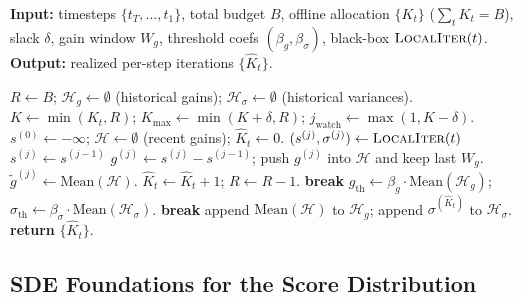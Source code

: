 \begin{algorithm}[t]
\caption{GAINS: Global Adaptive Inference-time Noise Scheduling}
\label{alg:offline_online_budget}
\begin{algorithmic}[1]
\STATE \textbf{Input:} timesteps $\{t_T,\dots,t_1\}$, total budget $B$, offline allocation $\{K_t\}$ ($\sum_t K_t=B$),
slack $\delta$, gain window $W_g$, threshold coefs $(\beta_g,\beta_\sigma)$, black-box $\textsc{LocalIter}(t)$.
\STATE \textbf{Output:} realized per-step iterations $\{\widehat K_t\}$.

\STATE $R \leftarrow B$; \quad $\mathcal{H}_g\leftarrow\emptyset$ (historical gains); \quad $\mathcal{H}_\sigma\leftarrow\emptyset$ (historical variances).
    \STATE $K \leftarrow \min(K_t, R)$; \quad $K_{\max}\leftarrow \min(K+\delta, R)$; \quad $j_{\text{watch}}\leftarrow \max(1, K-\delta)$.
    \STATE $s^{(0)} \leftarrow -\infty$; \quad $\mathcal{H}\leftarrow\emptyset$ (recent gains); \quad $\widehat K_t \leftarrow 0$.
        \STATE $(s^{(j)}, \sigma^{(j)}) \leftarrow \textsc{LocalIter}(t)$
            \STATE $s^{(j)} \leftarrow s^{(j-1)}$ \hfill {}
        \ENDIF
        \STATE $g^{(j)} \leftarrow s^{(j)} - s^{(j-1)}$; push $g^{(j)}$ into $\mathcal{H}$ and keep last $W_g$.
        \STATE $\widetilde g^{(j)} \leftarrow \mathrm{Mean}(\mathcal{H})$.
        \STATE $\widehat K_t \leftarrow \widehat K_t + 1$; \quad $R \leftarrow R - 1$.
         \STATE \textbf{break} \ENDIF
            \STATE $g_{\mathrm{th}}\leftarrow \beta_g \cdot \mathrm{Mean}(\mathcal{H}_g)$;\quad
                   $\sigma_{\mathrm{th}}\leftarrow \beta_\sigma \cdot \mathrm{Mean}(\mathcal{H}_\sigma)$.
                \STATE \textbf{break}
            \ENDIF
        \ENDIF
    \ENDFOR
    \STATE append $\mathrm{Mean}(\mathcal{H})$ to $\mathcal{H}_g$; append $\sigma^{(\widehat K_t)}$ to $\mathcal{H}_\sigma$.
\ENDFOR
\STATE \textbf{return} $\{\widehat K_t\}$.
\end{algorithmic}
\end{algorithm}

\subsection{SDE Foundations for the Score Distribution}
\label{sec:sde-foundations}

